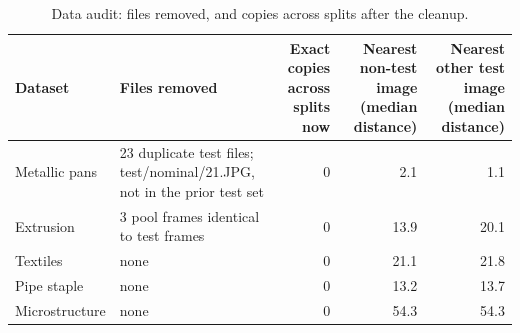 \begin{table}

\caption{\label{tab:tbl-audit}Data audit: files removed, and copies across splits after the cleanup.}
\centering
\begin{tabular}[t]{llrrr}
\toprule
Dataset & Files removed & Exact copies across splits now & Nearest non-test image (median distance) & Nearest other test image (median distance)\\
\midrule
Metallic pans & 23 duplicate test files; test/nominal/21.JPG, not in the prior test set & 0 & 2.1 & 1.1\\
Extrusion & 3 pool frames identical to test frames & 0 & 13.9 & 20.1\\
Textiles & none & 0 & 21.1 & 21.8\\
Pipe staple & none & 0 & 13.2 & 13.7\\
Microstructure & none & 0 & 54.3 & 54.3\\
\bottomrule
\end{tabular}
\end{table}
